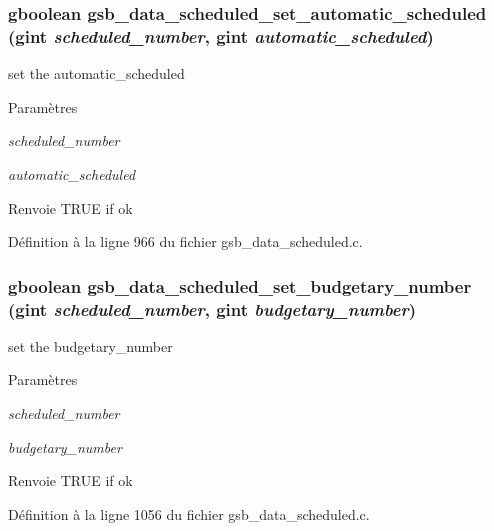 \subsubsection[{gsb\_\-data\_\-scheduled\_\-set\_\-automatic\_\-scheduled}]{\setlength{\rightskip}{0pt plus 5cm}gboolean gsb\_\-data\_\-scheduled\_\-set\_\-automatic\_\-scheduled (gint {\em scheduled\_\-number}, \/  gint {\em automatic\_\-scheduled})}\label{gsb__data__scheduled_8c_a9ef9808e521e8ba0651d9ca8c3e57e83}
set the automatic\_\-scheduled


\begin{DoxyParams}{Paramètres}
\item[{\em scheduled\_\-number}]\item[{\em automatic\_\-scheduled}]\end{DoxyParams}
\begin{DoxyReturn}{Renvoie}
TRUE if ok 
\end{DoxyReturn}


Définition à la ligne 966 du fichier gsb\_\-data\_\-scheduled.c.

\subsubsection[{gsb\_\-data\_\-scheduled\_\-set\_\-budgetary\_\-number}]{\setlength{\rightskip}{0pt plus 5cm}gboolean gsb\_\-data\_\-scheduled\_\-set\_\-budgetary\_\-number (gint {\em scheduled\_\-number}, \/  gint {\em budgetary\_\-number})}\label{gsb__data__scheduled_8c_a2e5a09822c03b4147c3d0b7c0b727e78}
set the budgetary\_\-number


\begin{DoxyParams}{Paramètres}
\item[{\em scheduled\_\-number}]\item[{\em budgetary\_\-number}]\end{DoxyParams}
\begin{DoxyReturn}{Renvoie}
TRUE if ok 
\end{DoxyReturn}


Définition à la ligne 1056 du fichier gsb\_\-data\_\-scheduled.c.

